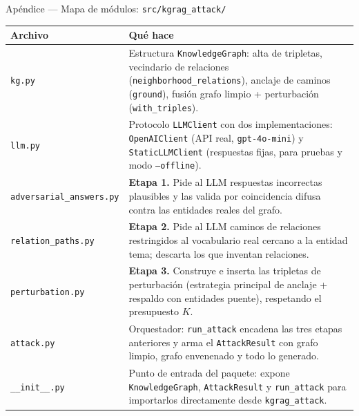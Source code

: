 \documentclass[aspectratio=169]{beamer}
\begin{document}
\begin{frame}[fragile]{Apéndice --- Mapa de módulos: \texttt{src/kgrag\_attack/}}
  \scriptsize
  \centering
  \renewcommand{\arraystretch}{0.85}
  \begin{tabular}{@{}l p{7.6cm}@{}}
    \toprule
    \textbf{Archivo} & \textbf{Qué hace} \\
    \midrule
    \texttt{kg.py} &
      Estructura \texttt{KnowledgeGraph}: alta de tripletas, vecindario de
      relaciones (\texttt{neighborhood\_relations}), anclaje de caminos
      (\texttt{ground}), fusión grafo limpio + perturbación
      (\texttt{with\_triples}). \\
    \texttt{llm.py} &
      Protocolo \texttt{LLMClient} con dos implementaciones:
      \texttt{OpenAIClient} (API real, \texttt{gpt-4o-mini}) y
      \texttt{StaticLLMClient} (respuestas fijas, para pruebas y modo
      \texttt{--offline}). \\
    \texttt{adversarial\_answers.py} &
      \textbf{Etapa 1.} Pide al LLM respuestas incorrectas plausibles y las
      valida por coincidencia difusa contra las entidades reales del grafo. \\
    \texttt{relation\_paths.py} &
      \textbf{Etapa 2.} Pide al LLM caminos de relaciones restringidos al
      vocabulario real cercano a la entidad tema; descarta los que inventan
      relaciones. \\
    \texttt{perturbation.py} &
      \textbf{Etapa 3.} Construye e inserta las tripletas de perturbación
      (estrategia principal de anclaje + respaldo con entidades puente),
      respetando el presupuesto $K$. \\
    \texttt{attack.py} &
      Orquestador: \texttt{run\_attack} encadena las tres etapas anteriores y
      arma el \texttt{AttackResult} con grafo limpio, grafo envenenado y todo
      lo generado. \\
    \texttt{\_\_init\_\_.py} &
      Punto de entrada del paquete: expone \texttt{KnowledgeGraph},
      \texttt{AttackResult} y \texttt{run\_attack} para importarlos
      directamente desde \texttt{kgrag\_attack}. \\
    \bottomrule
  \end{tabular}
\end{frame}
\end{document}
